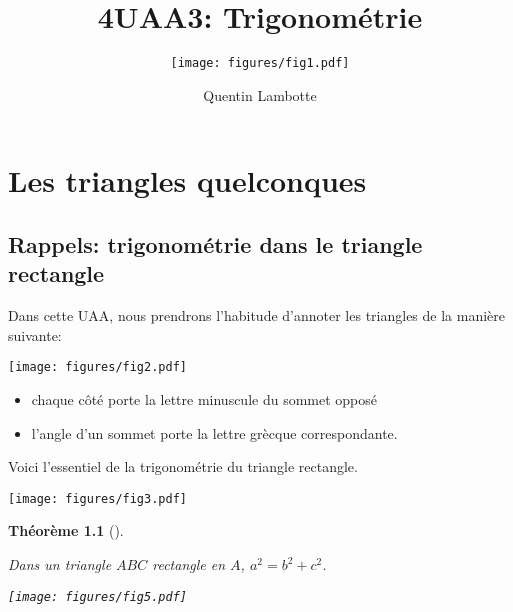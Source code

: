 \documentclass[
  a4paper,
  DIV=11,
  numbers=noendperiod,
  oneside]{scrreprt}
\subtitle{\vspace{3cm}\texttt{[image: figures/fig1.pdf]}\vspace{3cm}}
\title{4UAA3: Trigonométrie}
\author{Quentin Lambotte}
\date{}
\providecommand{\tightlist}{%
  \setlength{\itemsep}{0pt}\setlength{\parskip}{0pt}}\usepackage{longtable,booktabs,array}
\theoremstyle{definition}
\theoremstyle{definition}
\theoremstyle{plain}
\newtheorem{theorem}{Théorème}[chapter]
\theoremstyle{definition}
\theoremstyle{remark}
\begin{document}
\maketitle



\chapter*{}\label{section}

\markboth{}{}


\chapter{Les triangles quelconques}\label{les-triangles-quelconques}

\section{Rappels: trigonométrie dans le triangle
rectangle}\label{rappels-trigonomuxe9trie-dans-le-triangle-rectangle}

Dans cette UAA, nous prendrons l'habitude d'annoter les triangles de la
manière suivante:

\begin{center}
\texttt{[image: figures/fig2.pdf]}
\end{center}

\begin{itemize}
\tightlist
\item
  chaque côté porte la lettre minuscule du sommet opposé
\item
  l'angle d'un sommet porte la lettre grècque correspondante.
\end{itemize}

Voici l'essentiel de la trigonométrie du triangle rectangle.

\begin{center}
\texttt{[image: figures/fig3.pdf]}
\end{center}

\begin{theorem}[]\protect\hypertarget{thm-pytagore}{}\label{thm-pytagore}

Dans un triangle \(ABC\) rectangle en \(A\), \(a^2=b^2+c^2\).

\begin{center}
\texttt{[image: figures/fig5.pdf]}
\end{center}

\end{theorem}
\end{document}
